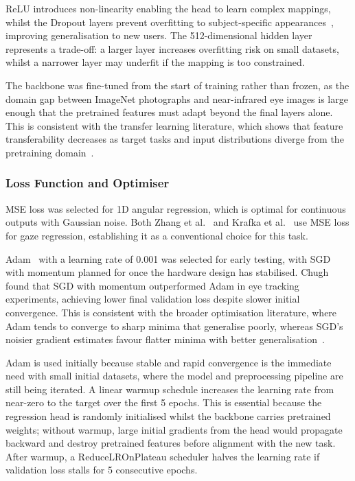 ReLU introduces non-linearity enabling the head to learn complex mappings, whilst the Dropout layers prevent overfitting to subject-specific appearances~\cite{srivastava2014dropout}, improving generalisation to new users. The 512-dimensional hidden layer represents a trade-off: a larger layer increases overfitting risk on small datasets, whilst a narrower layer may underfit if the mapping is too constrained.

The backbone was fine-tuned from the start of training rather than frozen, as the domain gap between ImageNet photographs and near-infrared eye images is large enough that the pretrained features must adapt beyond the final layers alone. This is consistent with the transfer learning literature, which shows that feature transferability decreases as target tasks and input distributions diverge from the pretraining domain~\cite{yosinski2014transferable}.

\subsubsection{Loss Function and Optimiser}

MSE loss was selected for 1D angular regression, which is optimal for continuous outputs with Gaussian noise. Both Zhang et al.~\cite{zhang2015appearance} and Krafka et al.~\cite{krafka2016eye} use MSE loss for gaze regression, establishing it as a conventional choice for this task.

Adam~\cite{kingma2015adam} with a learning rate of 0.001 was selected for early testing, with SGD with momentum planned for once the hardware design has stabilised. Chugh~\cite{chugh2020eye} found that SGD with momentum outperformed Adam in eye tracking experiments, achieving lower final validation loss despite slower initial convergence. This is consistent with the broader optimisation literature, where Adam tends to converge to sharp minima that generalise poorly, whereas SGD's noisier gradient estimates favour flatter minima with better generalisation~\cite{keskar2017large, wilson2017marginal}.

Adam is used initially because stable and rapid convergence is the immediate need with small initial datasets, where the model and preprocessing pipeline are still being iterated. A linear warmup schedule increases the learning rate from near-zero to the target over the first 5 epochs. This is essential because the regression head is randomly initialised whilst the backbone carries pretrained weights; without warmup, large initial gradients from the head would propagate backward and destroy pretrained features before alignment with the new task. After warmup, a ReduceLROnPlateau scheduler halves the learning rate if validation loss stalls for 5 consecutive epochs.

